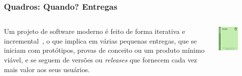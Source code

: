 \documentclass[aspectratio=169]{beamer}
\begin{document}
\begin{frame}
\frametitle{Quadros: Quando? Entregas}
\begin{columns}
    \begin{column}{.66\textwidth}
Um projeto de software moderno é feito de forma iterativa e incremental~\citep{pressman:2019,essential:scrum}, o que implica em várias pequenas entregas, que se iniciam com protótipos, provas de conceito ou um produto mínimo viável, e se seguem de versões ou \textit{releases} que fornecem cada vez mais valor aos seus usuários.
    \end{column}
    \begin{column}{.33\textwidth}
            \centering
    \includegraphics[width=0.6\textwidth]{detalhes/quando.png}
    \end{column}
\end{columns} 
\end{frame}
\end{document}
